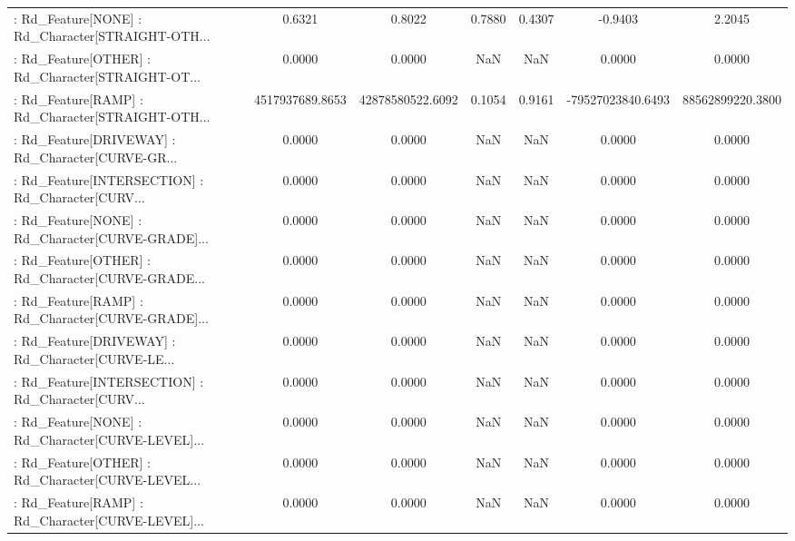 \begin{longtable}{p{4cm}cccccc}
 : Rd\_Feature[NONE] : Rd\_Character[STRAIGHT-OTH... &            0.6321 &            0.8022 &  0.7880 &       0.4307 &            -0.9403 &            2.2045 \\
 : Rd\_Feature[OTHER] : Rd\_Character[STRAIGHT-OT... &            0.0000 &            0.0000 &     NaN &          NaN &             0.0000 &            0.0000 \\
 : Rd\_Feature[RAMP] : Rd\_Character[STRAIGHT-OTH... &   4517937689.8653 &  42878580522.6092 &  0.1054 &       0.9161 &  -79527023840.6493 &  88562899220.3800 \\
 : Rd\_Feature[DRIVEWAY] : Rd\_Character[CURVE-GR... &            0.0000 &            0.0000 &     NaN &          NaN &             0.0000 &            0.0000 \\
 : Rd\_Feature[INTERSECTION] : Rd\_Character[CURV... &            0.0000 &            0.0000 &     NaN &          NaN &             0.0000 &            0.0000 \\
 : Rd\_Feature[NONE] : Rd\_Character[CURVE-GRADE]... &            0.0000 &            0.0000 &     NaN &          NaN &             0.0000 &            0.0000 \\
 : Rd\_Feature[OTHER] : Rd\_Character[CURVE-GRADE... &            0.0000 &            0.0000 &     NaN &          NaN &             0.0000 &            0.0000 \\
 : Rd\_Feature[RAMP] : Rd\_Character[CURVE-GRADE]... &            0.0000 &            0.0000 &     NaN &          NaN &             0.0000 &            0.0000 \\
 : Rd\_Feature[DRIVEWAY] : Rd\_Character[CURVE-LE... &            0.0000 &            0.0000 &     NaN &          NaN &             0.0000 &            0.0000 \\
 : Rd\_Feature[INTERSECTION] : Rd\_Character[CURV... &            0.0000 &            0.0000 &     NaN &          NaN &             0.0000 &            0.0000 \\
 : Rd\_Feature[NONE] : Rd\_Character[CURVE-LEVEL]... &            0.0000 &            0.0000 &     NaN &          NaN &             0.0000 &            0.0000 \\
 : Rd\_Feature[OTHER] : Rd\_Character[CURVE-LEVEL... &            0.0000 &            0.0000 &     NaN &          NaN &             0.0000 &            0.0000 \\
 : Rd\_Feature[RAMP] : Rd\_Character[CURVE-LEVEL]... &            0.0000 &            0.0000 &     NaN &          NaN &             0.0000 &            0.0000 \\

\end{longtable}
